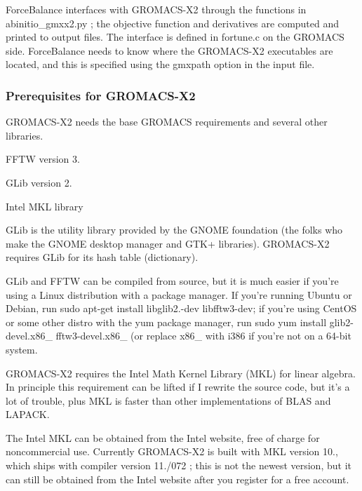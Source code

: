 \-Force\-Balance interfaces with \-G\-R\-O\-M\-A\-C\-S-\/\-X2 through the functions in {\ttfamily abinitio\-\_\-gmxx2.\-py} ; the objective function and derivatives are computed and printed to output files. \-The interface is defined in {\ttfamily fortune.\-c} on the \-G\-R\-O\-M\-A\-C\-S side. \-Force\-Balance needs to know where the \-G\-R\-O\-M\-A\-C\-S-\/\-X2 executables are located, and this is specified using the {\ttfamily gmxpath} option in the input file.\hypertarget{installation_install_gmxx2_prerequisites}{}\subsubsection{\-Prerequisites for G\-R\-O\-M\-A\-C\-S-\/\-X2}\label{installation_install_gmxx2_prerequisites}
\-G\-R\-O\-M\-A\-C\-S-\/\-X2 needs the base \-G\-R\-O\-M\-A\-C\-S requirements and several other libraries.

\begin{DoxyItemize}
\item \-F\-F\-T\-W version 3. \item \-G\-Lib version 2. \item \-Intel \-M\-K\-L library\end{DoxyItemize}
\-G\-Lib is the utility library provided by the \-G\-N\-O\-M\-E foundation (the folks who make the \-G\-N\-O\-M\-E desktop manager and \-G\-T\-K+ libraries). \-G\-R\-O\-M\-A\-C\-S-\/\-X2 requires \-G\-Lib for its hash table (dictionary).

\-G\-Lib and \-F\-F\-T\-W can be compiled from source, but it is much easier if you're using a \-Linux distribution with a package manager. \-If you're running \-Ubuntu or \-Debian, run {\ttfamily sudo apt-\/get install libglib2.-\/dev libfftw3-\/dev}; if you're using \-Cent\-O\-S or some other distro with the yum package manager, run {\ttfamily sudo yum install glib2-\/devel.\-x86\-\_ fftw3-\/devel.\-x86\-\_} (or replace {\ttfamily x86\-\_} with {\ttfamily i386} if you're not on a 64-\/bit system.

\-G\-R\-O\-M\-A\-C\-S-\/\-X2 requires the \-Intel \-Math \-Kernel \-Library (\-M\-K\-L) for linear algebra. \-In principle this requirement can be lifted if \-I rewrite the source code, but it's a lot of trouble, plus \-M\-K\-L is faster than other implementations of \-B\-L\-A\-S and \-L\-A\-P\-A\-C\-K.

\-The \-Intel \-M\-K\-L can be obtained from the \-Intel website, free of charge for noncommercial use. \-Currently \-G\-R\-O\-M\-A\-C\-S-\/\-X2 is built with \-M\-K\-L version 10., which ships with compiler version 11./072 ; this is not the newest version, but it can still be obtained from the \-Intel website after you register for a free account.

